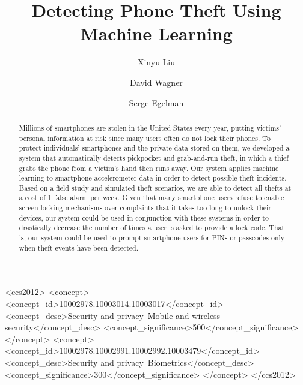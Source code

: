\documentclass[sigconf]{acmart}
\begin{document}
\title{Detecting Phone Theft Using Machine Learning}

\author{Xinyu Liu}
\author{David Wagner}
\author{Serge Egelman}

\begin{abstract}
Millions of smartphones are stolen in the United States every year, putting victims' personal information at risk since many users often do not lock their phones.
To protect individuals' smartphones and the private data stored on them, we developed a system that automatically detects pickpocket and grab-and-run theft, in which a thief grabs the phone from a victim's hand then runs away.
Our system applies machine learning to smartphone accelerometer data in order to detect possible theft incidents. Based on a field study and simulated theft scenarios, we are able to detect all thefts at a cost of 1 false alarm per week. Given that many smartphone users refuse to enable screen locking mechanisms over complaints that it takes too long to unlock their devices, our system could be used in conjunction with these systems in order to drastically decrease the number of times a user is asked to provide a lock code. That is, our system could be used to prompt smartphone users for PINs or passcodes only when theft events have been detected.
\end{abstract}

\begin{CCSXML}
<ccs2012>
<concept>
<concept_id>10002978.10003014.10003017</concept_id>
<concept_desc>Security and privacy~Mobile and wireless security</concept_desc>
<concept_significance>500</concept_significance>
</concept>
<concept>
<concept_id>10002978.10002991.10002992.10003479</concept_id>
<concept_desc>Security and privacy~Biometrics</concept_desc>
<concept_significance>300</concept_significance>
</concept>
</ccs2012>
\end{CCSXML}
\end{document}
